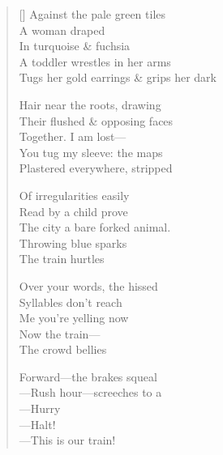 \label{ch:leaning}
\settowidth{\versewidth}{Tugs her gold earrings \& grips her dark}
\begin{verse}[\versewidth]
Against the pale green tiles\\
A woman draped\\
In turquoise \& fuchsia\\
A toddler wrestles in her arms\\
Tugs her gold earrings \& grips her dark

Hair near the roots, drawing\\
Their flushed \& opposing faces\\
Together.     I am lost---\\
You tug my sleeve: the maps\\
Plastered everywhere, stripped

Of irregularities easily\\
Read by a child prove\\
The city a bare forked animal.\\
Throwing blue sparks\\
The train hurtles

Over your words, the hissed\\
Syllables don't reach\\
Me     you're yelling now\\
Now the train---\\
The crowd bellies

Forward---the brakes squeal\\
---Rush hour---screeches to a\\
---Hurry\\
---Halt!\\
---This is our train!
\end{verse}
